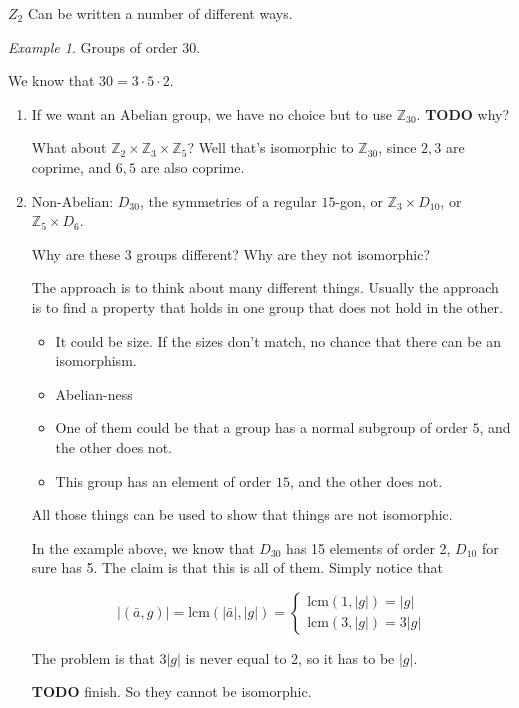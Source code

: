 \documentclass[12pt]{article}
\def\lcm{\text{lcm}}
\def\Z{{\mathbb Z}}
\def\TODO{\color{red}\textbf{TODO}\color{black}}
\theoremstyle{remark}
\theoremstyle{remark}
\theoremstyle{remark}
\newtheorem{example}{Example}
\theoremstyle{remark}
\theoremstyle{remark}
\begin{document}
$Z_2$ Can be written a number of different ways.

\begin{example}
  Groups of order $30$.

  We know that $30 = 3 \cdot 5 \cdot 2$.

  \begin{enumerate}
    \item If we want an Abelian group, we have no choice but to use $\Z_{30}$.
      \TODO{} why?

      What about $\Z_2 \times \Z_3 \times \Z_5$? Well that's isomorphic to
      $\Z_{30}$, since $2, 3$ are coprime, and $6, 5$ are also coprime.

    \item Non-Abelian: $D_{30}$, the symmetries of a regular $15$-gon, or
      $\Z_{3} \times D_{10}$, or $\Z_5 \times D_6$.

      Why are these 3 groups different? Why are they not isomorphic?

      The approach is to think about many different things. Usually the approach
      is to find a property that holds in one group that does not hold in the
      other.

      \begin{itemize}
        \item It could be size. If the sizes don't match, no chance that there
          can be an isomorphism.
        \item Abelian-ness
        \item One of them could be that a group has a normal subgroup of order
          $5$, and the other does not.
        \item This group has an element of order $15$, and the other does not.
      \end{itemize}

      All those things can be used to show that things are not isomorphic.

      In the example above, we know that $D_{30}$ has 15 elements of order 2,
      $D_{10}$ for sure has 5. The claim is that this is all of them. Simply
      notice that

      \[
        |(\bar a, g)| = \lcm(|\bar a|, |g|) = \begin{cases}
          \lcm(1, |g|) = |g| \\
          \lcm(3, |g|) = 3|g|
        \end{cases}
      \]

      The problem is that $3|g|$ is never equal to $2$, so it has to be $|g|$.

      \TODO{} finish. So they cannot be isomorphic.
  \end{enumerate}
\end{example}
\end{document}
